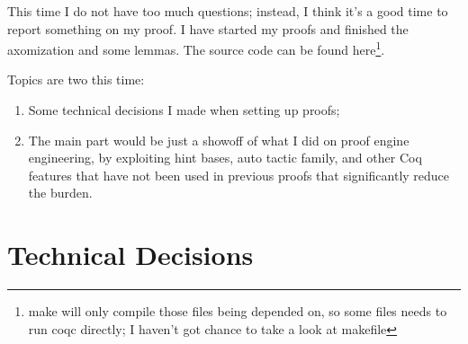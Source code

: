 \documentclass{article}
\theoremstyle{definition}
\begin{document}

This time I do not have too much questions; instead, I think it's a good time to
report something on my proof. I have started my proofs and finished the axomization
and some lemmas. The source code can be found here\cite{source}\footnote{make will
  only compile those files being depended on, so some files needs to run coqc
  directly; I haven't got chance to take a look at makefile}.

Topics are two this time:
\begin{enumerate}
\item Some technical decisions I made when setting up proofs;
\item The main part would be just a showoff of what I did on proof engine engineering,
  by exploiting hint bases, auto tactic family, and other Coq features that have not
  been used in previous proofs that significantly reduce the burden.
\end{enumerate}

\section{Technical Decisions}
\end{document}
